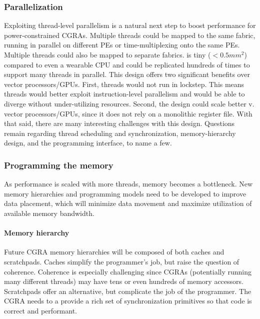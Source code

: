 \subsubsection{Parallelization}
Exploiting thread-level parallelism is a natural next step to boost performance for power-constrained CGRAs.
% 
Multiple threads could be mapped to the same fabric, running in parallel on different PEs or time-multiplexing onto the same PEs.
%
Multiple threads could also be mapped to separate fabrics. 
% 
\riptide is tiny ($<0.5mm^2$) compared to even a wearable CPU and could be replicated hundreds of times to support many threads in parallel.
% 
This design offers two significant benefits over vector processors/GPUs.
% 
First, threads would not run in lockstep.
This means threads would better exploit instruction-level parallelism and would be able to diverge without under-utilizing resources.
Second, the design could scale better v. vector processors/GPUs, since it does not rely on a monolithic register file.
% 
With that said, there are many interesting challenges with this design.
% 
Questions remain regarding thread scheduling and synchronization, memory-hierarchy design, and the programming interface, to name a few.

\subsubsection{Programming the memory}
As performance is scaled with more threads, memory becomes a bottleneck.
% 
New memory hierarchies and programming models need to be developed to improve data placement, which will minimize data movement and maximize utilization of available memory bandwidth.

\paragraph{Memory hierarchy}
Future CGRA memory hierarchies will be composed of both caches and scratchpads.
% 
Caches simplify the programmer's job, but raise the question of coherence.
% 
Coherence is especially challenging since CGRAs (potentially running many different threads) may have tens or even hundreds of memory accessors.
% 
Scratchpads offer an alternative, but complicate the job of the programmer.
% 
The CGRA needs to a provide a rich set of synchronization primitives so that code is correct and performant.


